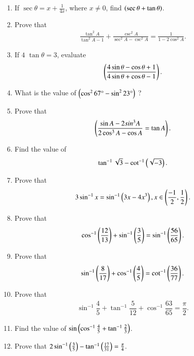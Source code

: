\begin{enumerate}[label=\thesubsection.\arabic*,ref=\thesubsection.\theenumi,itemsep=1pt]
  
  \hfill{}\item If $\sec\theta = x + \frac{1}{4x}$, where $x \neq 0$, find $\left(\sec\theta + \tan\theta\right)$.
  \hfill{}\item Prove that \begin{align*} \frac{\tan^2A}{\tan^2 A-1}+\frac{\csc^2 A}{\sec^2 A-\csc^2 A}=\frac{1}{1-2\cos^2 A}.\end{align*}
\hfill{}
\item If $4$ $\tan\theta=3$, evaluate \begin{align*}\left(\frac{4 \sin\theta - \cos\theta + 1 }{ 4 \sin\theta + \cos\theta - 1 } \right) .\end{align*}  
\hfill{}
\item What is the value of $ \left(\cos^2 67\degree - \sin^2 23\degree\right)$ ?
\hfill{}\item  Prove that $$\left(\frac{\sin A - 2sin^3 A}{2 \cos^3 A-\cos A} = \tan A \right).$$
			\hfill{}
\item Find the value of
	\begin{align*}
		\tan^{-1}\sqrt{3}-\cot^{-1}\left(\sqrt{-3}\right)
	.\end{align*}
 \hfill{}\item Prove that 
			\begin{align*}
		3\sin^{-1}x=\sin^{-1}\left(3x-4x^3\right), x\in\left(\frac{-1}{2},\frac{1}{2}\right)
			.\end{align*}
\hfill{}\item Prove that 
	\begin{align*}
		\cos^{-1}\left(\frac{12}{13}\right)+\sin^{-1}\left(\frac{3}{5}\right)=\sin^{-1} \left(\frac{56}{65}\right)
	.\end{align*}
 \hfill{}\item Prove that 
         \begin{align*}
          \sin^{-1}\left(\dfrac{8}{17}\right)+\cos^{-1}\left(\dfrac{4}{5}\right)=\cot^{-1}\left(\dfrac{36}{77}\right)
         .\end{align*}
\hfill{}\item Prove that 
    \begin{align*}
       \sin^{-1}\dfrac{4}{5}+\tan^{-1}\dfrac{5}{12}+\cos^{-1}\dfrac{63}{65}=\dfrac{\pi}{2}
    .\end{align*}
\hfill{}
\item Find the value of $\sin\left(\cos^{-1}{\frac{4}{5}}+{\tan^{-1}{\frac{2}{3}}}\right)$.
\hfill{}
\item Prove that $ 2\sin^{-1} \left(\frac{3}{5}\right) - \tan^{-1} \left(\frac{17}{31}\right) = \frac{\pi}{4}$.

\end{enumerate}
